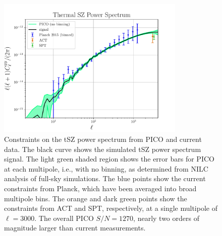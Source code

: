 \documentclass[PICOReport.tex]{subfiles}
\begin{document}
\begin{figure}
\begin{center}
\includegraphics[width=0.8\textwidth]{images/PICO_tSZ_PS_plot.pdf}
\end{center}
\caption{\label{fig:PICO_tSZ_PS} Constraints on the tSZ power spectrum from PICO and current data.  The black curve shows the simulated tSZ power spectrum signal.  The light green shaded region shows the error bars for PICO at each multipole, i.e., with no binning, as determined from NILC analysis of full-sky simulations.  The blue points show the current constraints from Planck, which have been averaged into broad multipole bins.  The orange and dark green points show the constraints from ACT and SPT, respectively, at a single multipole of $\ell=3000$.  The overall PICO $S/N = 1270$, nearly two orders of magnitude larger than current measurements.}
\end{figure}
\end{document}
